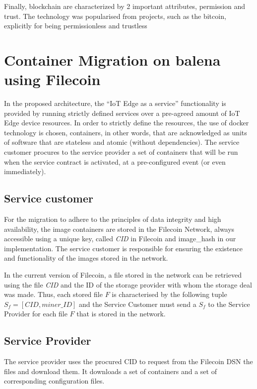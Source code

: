 Finally, blockchain are characterized by 2 important attributes, \gls{permission} and trust. The technology was popularised from projects, such as the bitcoin, explicitly for being permissionless and trustless

\section{Container Migration on balena using Filecoin} \label{st:balena-filecoin}

In the proposed architecture, the “IoT Edge as a service” functionality is provided by running strictly defined services over a pre-agreed amount of IoT Edge device resources. In order to strictly define the resources, the use of docker technology is chosen, containers, in other words, that are acknowledged as units of software that are stateless and atomic (without dependencies). The service customer procures to the service provider a set of containers that will be run when the service contract is activated, at a pre-configured event (or even immediately).

\subsection{Service customer}

For the migration to adhere to the principles of data integrity and high availability, the image containers are stored in the Filecoin Network, always accessible using a unique key, called \textit{CID} in Filecoin and image\_hash in our implementation. The service customer is responsible for ensuring the existence and functionality of the images stored in the network.

In the current version of Filecoin, a file stored in the network can be retrieved  using the file \textit{CID} and the ID of the storage provider with whom the storage deal was made. Thus, each stored file $F$ is characterised by the following tuple $S_f = [CID, miner\_ID]$ and the Service Customer must send a $S_f$ to the Service Provider for each file $F$ that is stored in the network.

\subsection{Service Provider}

The service provider uses the procured CID to request from the Filecoin DSN the files and download them. It downloads a set of containers and a set of corresponding configuration files.

